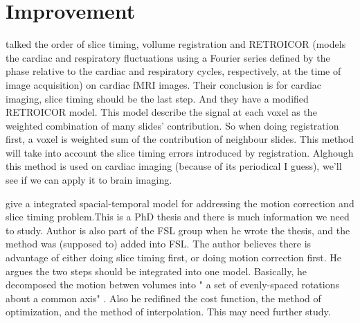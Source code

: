 \documentclass[fleqn]{article}
\begin{document}
\section{Improvement}
\citet{Jones2008582} talked the order of slice timing, vollume registration and RETROICOR (models the cardiac and respiratory fluctuations using a Fourier series defined by the phase relative to the cardiac and respiratory cycles, respectively, at the time of image acquisition) on cardiac fMRI images. Their conclusion is for cardiac imaging, slice timing should be the last step. And they have a modified RETROICOR model. This model describe the signal at each voxel as the weighted combination of many slides' contribution. So when doing registration first, a voxel is weighted sum of the contribution of neighbour slides. This method will take into account the slice timing errors introduced by registration. Alghough this method is used on cardiac imaging (because of its periodical I guess), we'll see if we can apply it to brain imaging.

\citet{Bannister03} give a integrated spacial-temporal model for addressing the motion correction and slice timing problem.This is a PhD thesis and there is much information we need to study. Author is also part of the FSL group when he wrote the thesis, and the method was (supposed to) added into FSL. The author believes there is advantage of either doing slice timing first, or doing motion correction first. He argues the two steps should be integrated into one model. Basically, he decomposed the motion betwen volumes into " a set of evenly-spaced rotations about a common axis" \citep{Bannister03}. Also he redifined the cost function, the method of optimization, and the method of interpolation. This may need further study.




\end{document}
